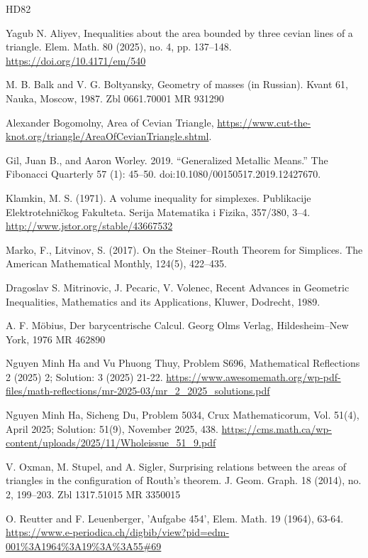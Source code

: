 \documentclass{article}
\begin{document}
\begin{thebibliography}{HD82}

 Yagub N. Aliyev, Inequalities about the area bounded by three cevian lines of a triangle. Elem. Math. 80 (2025), no. 4, pp. 137–148.  \url{https://doi.org/10.4171/em/540}

 M. B. Balk and V. G. Boltyansky, Geometry of masses (in Russian). Kvant 61, Nauka, Moscow, 1987. Zbl 0661.70001 MR 931290

 Alexander Bogomolny, Area of Cevian Triangle, \url{https://www.cut-the-knot.org/triangle/AreaOfCevianTriangle.shtml}. 

 Gil, Juan B., and Aaron Worley. 2019. “Generalized Metallic Means.” The Fibonacci Quarterly 57 (1): 45–50. doi:10.1080/00150517.2019.12427670.

 Klamkin, M. S. (1971). A volume inequality for simplexes. Publikacije Elektrotehničkog Fakulteta. Serija Matematika i Fizika, 357/380, 3–4. \url{http://www.jstor.org/stable/43667532}

 Marko, F., Litvinov, S. (2017). On the Steiner–Routh Theorem for Simplices. The American Mathematical Monthly, 124(5), 422–435.

 Dragoslav S. Mitrinovic, J. Pecaric, V. Volenec, Recent Advances in Geometric Inequalities, Mathematics and its Applications, Kluwer, Dodrecht, 1989.

 A. F. Möbius, Der barycentrische Calcul. Georg Olms Verlag, Hildesheim–New York, 1976 MR 462890

 Nguyen Minh Ha and Vu Phuong Thuy, Problem S696, Mathematical Reflections 2 (2025) 2; Solution: 3 (2025) 21-22. \url{https://www.awesomemath.org/wp-pdf-files/math-reflections/mr-2025-03/mr_2_2025_solutions.pdf}

 Nguyen Minh Ha, Sicheng Du, Problem 5034, Crux Mathematicorum, Vol. 51(4), April 2025; Solution: 51(9), November 2025, 438. \url{https://cms.math.ca/wp-content/uploads/2025/11/Wholeissue_51_9.pdf}

 V. Oxman, M. Stupel, and A. Sigler, Surprising relations between the areas of triangles in the configuration
of Routh’s theorem. J. Geom. Graph. 18 (2014), no. 2, 199–203. Zbl 1317.51015 MR 3350015

 O. Reutter and F. Leuenberger, 'Aufgabe 454', Elem. Math. 19 (1964), 63-64. \url{https://www.e-periodica.ch/digbib/view?pid=edm-001%3A1964%3A19%3A%3A55#69}


\end{thebibliography}
\end{document}

